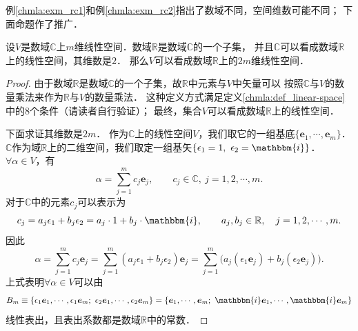 
例\ref{chmla:exm_rc1}和例\ref{chmla:exm_rc2}指出了数域不同，空间维数可能不同；
下面命题作了推广．

\begin{proposition}\label{chcx:thm_rc}
    设$V$是数域$\mathbb{C}$上$m$维线性空间．数域$\mathbb{R}$是数域$\mathbb{C}$的一个子集，
    并且$\mathbb{C}$可以看成数域$\mathbb{R}$上的线性空间，其维数是$2$．
    那么$V$可以看成数域$\mathbb{R}$上的$2m$维线性空间．
\end{proposition}
\begin{proof}
由于数域$\mathbb{R}$是数域$\mathbb{C}$的一个子集，故$\mathbb{R}$中元素与$V$中矢量可以
按照$\mathbb{C}$与$V$的数量乘法来作为$\mathbb{R}$与$V$的数量乘法．
这种定义方式满足定义\ref{chmla:def_linear-space}中的8个条件（请读者自行验证）；
最终，集合$V$可以看成数域$\mathbb{R}$上的线性空间．

下面求证其维数是$2m$．
作为$\mathbb{C}$上的线性空间$V$，我们取它的一组基底$\{\boldsymbol{e}_1,\cdots,\boldsymbol{e}_m\}$．
$\mathbb{C}$作为域$\mathbb{R}$上的二维空间，我们取定一组基矢$\{\epsilon_1=1,\ \epsilon_2=\mathbbm{i}\}$．
$\forall \alpha \in V$，有
\begin{equation}
    \alpha = \sum_{j=1}^{m} c_j \boldsymbol{e}_j, \qquad
    c_j\in \mathbb{C},\  j=1,2,\cdots,m .
\end{equation}
对于$\mathbb{C}$中的元素$c_j$可以表示为
\begin{equation}
    c_j= a_j \epsilon_1 + b_j \epsilon_2 = a_j \cdot 1 + b_j \cdot \mathbbm{i},
    \qquad a_j,b_j \in \mathbb{R},\quad j=1,2,\cdots,m .
\end{equation}
因此
\begin{equation}
    \alpha= \sum_{j=1}^{m} c_j \boldsymbol{e}_j = \sum_{j=1}^{m} (a_j \epsilon_1 + b_j \epsilon_2) \boldsymbol{e}_j 
    = \sum_{j=1}^{m} \bigl(a_j (\epsilon_1 \boldsymbol{e}_j )+ b_j (\epsilon_2 \boldsymbol{e}_j )\bigr) . 
\end{equation}
上式表明$\forall \alpha \in V$可以由
\begin{equation*}
B_m\equiv\{\epsilon_1 \boldsymbol{e}_1,\cdots, \epsilon_1 \boldsymbol{e}_m;\ 
\epsilon_2 \boldsymbol{e}_1,\cdots, \epsilon_2 \boldsymbol{e}_m\}
= \{\boldsymbol{e}_1,\cdots, \boldsymbol{e}_m;\ 
\mathbbm{i} \boldsymbol{e}_1,\cdots, \mathbbm{i} \boldsymbol{e}_m\}
\end{equation*}
线性表出，且表出系数都是数域$\mathbb{R}$中的常数．


\end{proof}

